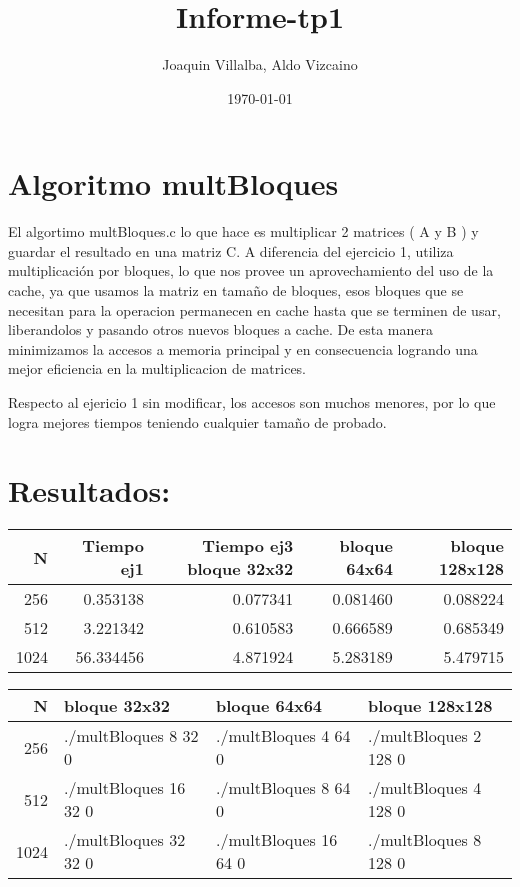 \documentclass[11pt]{article}
\author{Joaquin Villalba, Aldo Vizcaino}
\date{\today}
\title{Informe-tp1}
\begin{document}
\maketitle
\tableofcontents

\section{Algoritmo multBloques}
\label{sec-1}

El algortimo multBloques.c lo que hace es multiplicar 2 matrices ( A y
B ) y guardar el resultado en una matriz C. A diferencia del ejercicio
1, utiliza multiplicación por bloques, lo que nos provee un
aprovechamiento del uso de la cache, ya que usamos la matriz en tamaño
de bloques, esos bloques que se necesitan para la operacion permanecen
en cache hasta que se terminen de usar, liberandolos y pasando otros
nuevos bloques a cache. De esta manera minimizamos la accesos a
memoria principal y en consecuencia logrando una mejor eficiencia en
la multiplicacion de matrices.

Respecto al ejericio 1 sin modificar, los accesos son muchos menores,
por lo que logra mejores tiempos teniendo cualquier tamaño de probado.
\section{Resultados:}
\label{sec-2}

\begin{center}
\begin{tabular}{rrrrr}
N & Tiempo ej1 & Tiempo ej3 bloque 32x32 & bloque 64x64 & bloque 128x128\\
\hline
256 & 0.353138 & 0.077341 & 0.081460 & 0.088224\\
512 & 3.221342 & 0.610583 & 0.666589 & 0.685349\\
1024 & 56.334456 & 4.871924 & 5.283189 & 5.479715\\
\end{tabular}
\end{center}


\begin{center}
\begin{tabular}{rlll}
N & bloque 32x32 & bloque 64x64 & bloque 128x128\\
\hline
256 & ./multBloques 8 32 0 & ./multBloques 4 64 0 & ./multBloques 2 128 0\\
512 & ./multBloques 16 32 0 & ./multBloques 8 64 0 & ./multBloques 4 128 0\\
1024 & ./multBloques 32 32 0 & ./multBloques 16 64 0 & ./multBloques 8 128 0\\
\end{tabular}
\end{center}
\end{document}
